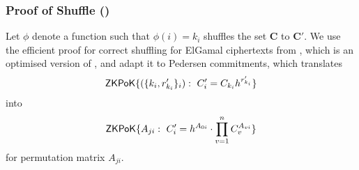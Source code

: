 \subsubsection{Proof of Shuffle (\PoS)}
Let $\phi$ denote a function such that $\phi(i)=k_i$ shuffles the set $\bm C$ to $\bm C'$.
We use the efficient proof for correct shuffling for ElGamal ciphertexts from \cite{Furukawa05}, which is an optimised version of \cite{FurukawaS01}, and adapt it to Pedersen commitments, which translates
\[
  \mathsf{ZKPoK}\{(\{k_i, r'_{k_i}\}_{i}) : ~ C'_{i}=C_{k_i}h^{r'_{k_i}}\}
\]
into
\[
  \mathsf{ZKPoK}\{A_{ji}:~ C'_i=h^{A_{0i}}\cdot\prod_{v=1}^n C_v^{A_{vi}}\}
\]
for permutation matrix $A_{ji}$.

